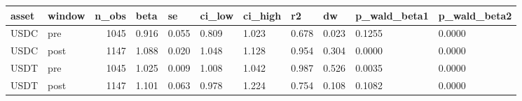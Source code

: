 \begin{tabular}{llrllllllll}
\toprule
asset & window & n_obs & beta & se & ci_low & ci_high & r2 & dw & p_wald_beta1 & p_wald_beta2 \\
\midrule
USDC & pre & 1045 & 0.916 & 0.055 & 0.809 & 1.023 & 0.678 & 0.023 & 0.1255 & 0.0000 \\
USDC & post & 1147 & 1.088 & 0.020 & 1.048 & 1.128 & 0.954 & 0.304 & 0.0000 & 0.0000 \\
USDT & pre & 1045 & 1.025 & 0.009 & 1.008 & 1.042 & 0.987 & 0.526 & 0.0035 & 0.0000 \\
USDT & post & 1147 & 1.101 & 0.063 & 0.978 & 1.224 & 0.754 & 0.108 & 0.1082 & 0.0000 \\
\bottomrule
\end{tabular}
